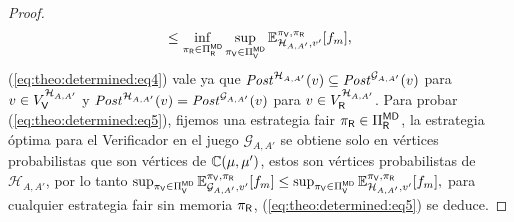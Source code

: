 \begin{proof}
\begin{equation}
    \leq 
     \inf_{\pi_{\mathsf{R}} \in \Pi_{\mathsf{R}}^{\mathsf{M}\mathsf{D}}} \sup_{\pi_{\mathsf{V}} \in \Pi_{\mathsf{V}}^{\mathsf{M}\mathsf{D}}} \mathbb{E}_{\mathcal{H}_{A,A'},v'}^{\pi_{\mathsf{V}},\pi_{\mathsf{R}}}[f_{m}],
\end{equation}
(\ref{eq:theo:determined:eq4}) vale ya que $\mathit{Post}^{\mathcal{H}_{A,A'}}(v) \subseteq \mathit{Post}^{\mathcal{G}_{A,A'}}(v)$ para $v \in V^{\mathcal{H}_{A,A'}}_{\mathsf{V}}$ y
$\mathit{Post}^{\mathcal{H}_{A,A'}}(v) = \mathit{Post}^{\mathcal{G}_{A,A'}}(v)$ para $v \in V^{\mathcal{H}_{A,A'}}_{\mathsf{R}}$.  Para probar (\ref{eq:theo:determined:eq5}), fijemos una estrategia fair $\pi_{\mathsf{R}} \in \Pi_{\mathsf{R}}^{\mathsf{M} \mathsf{D}}$, la estrategia óptima para el Verificador en el juego $\mathcal{G}_{A,A'}$ se obtiene solo en vértices probabilistas que son vértices de $\mathbb{C}(\mu,\mu')$, estos son vértices probabilistas de $\mathcal{H}_{A,A'}$, por lo tanto 
$  \sup_{\pi_{\mathsf{V}} \in \Pi_{\mathsf{V}}^{\mathsf{M}\mathsf{D}}} \mathbb{E}_{\mathcal{G}_{A,A'},v'}^{\pi_{\mathsf{V}},\pi_{\mathsf{R}}}[f_{m}]
    \leq 
     \sup_{\pi_{\mathsf{V}} \in \Pi_{\mathsf{V}}^{\mathsf{M}\mathsf{D}}} \mathbb{E}_{\mathcal{H}_{A,A'},v'}^{\pi_{\mathsf{V}},\pi_{\mathsf{R}}}[f_{m}],$
para cualquier estrategia fair sin memoria $\pi_{\mathsf{R}}$,  (\ref{eq:theo:determined:eq5}) se deduce.


\end{proof}
